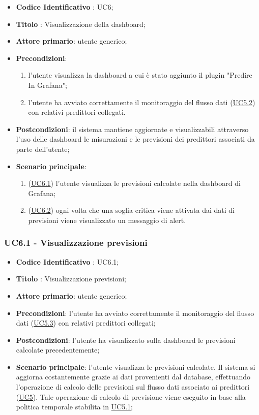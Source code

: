 		\begin{itemize}
			\item\textbf{Codice Identificativo} : UC6;
			\item\textbf{Titolo} : Visualizzazione della dashboard;
			\item\textbf{Attore primario}: utente generico;
			\item\textbf{Precondizioni}: 
			\begin{enumerate}
				\item l'utente visualizza la dashboard a cui è stato aggiunto il plugin "Predire In Grafana";
				\item l'utente ha avviato correttamente il monitoraggio del flusso dati (\hyperref[par:UC5.2]{UC5.2}) con relativi predittori collegati.
			\end{enumerate}				
			\item\textbf{Postcondizioni}: il sistema mantiene aggiornate e visualizzabili attraverso l'uso delle dashboard le misurazioni e le previsioni dei predittori associati da parte dell'utente;
			\item\textbf{Scenario principale}: 
			\begin{enumerate}
				\item (\hyperref[par:UC6.1]{UC6.1}) l'utente visualizza le previsioni calcolate nella dashboard di Grafana;
				\item (\hyperref[par:UC6.2]{UC6.2}) ogni volta che una soglia critica viene attivata dai dati di previsioni viene visualizzato un messaggio di alert.
			\end{enumerate}
				
		\end{itemize}
		
		\label{par:UC6.1}
	\subsubsection{UC6.1 - Visualizzazione previsioni}
		\begin{itemize}
			\item\textbf{Codice Identificativo} : UC6.1;
			\item\textbf{Titolo} : Visualizzazione previsioni;
			\item\textbf{Attore primario}: utente generico;
			\item\textbf{Precondizioni}: l'utente ha avviato correttamente il monitoraggio del flusso dati (\hyperref[par:UC5.3]{UC5.3}) con relativi predittori collegati;
			\item\textbf{Postcondizioni}: l'utente ha visualizzato sulla dashboard le previsioni calcolate precedentemente;
			\item\textbf{Scenario principale}: l'utente visualizza le previsioni calcolate. Il sistema si aggiorna costantemente grazie ai dati provenienti dal database, effettuando l'operazione di calcolo delle previsioni sul flusso dati associato ai predittori (\hyperref[par:UC5]{UC5}). Tale operazione di calcolo di previsione viene eseguito in base alla politica temporale stabilita in \hyperref[par:UC5.1]{UC5.1};	
		\end{itemize}
			
